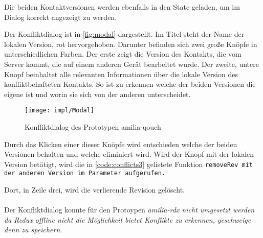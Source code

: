 Die beiden Kontaktversionen werden ebenfalls in den State geladen, um im Dialog korrekt angezeigt zu werden.
%
\begin{center}
  
\end{center}
%
Der Konfliktdialog ist in \autoref{fig:modal} dargestellt.
Im Titel steht der Name der lokalen Version, rot hervorgehoben.
Darunter befinden sich zwei große Knöpfe in unterschiedlichen Farben.
Der erste zeigt die Version des Kontakts, die vom Server kommt, die auf einem anderen Gerät bearbeitet wurde.
Der zweite, untere Knopf beinhaltet alle relevanten Informationen über die lokale Version des konfliktbehafteten Kontakts.
So ist zu erkennen welche der beiden Versionen die eigene ist und worin sie sich von der anderen unterscheidet.
%
\begin{figure}[H]
  \centering
  \texttt{[image: impl/Modal]}
  \grayRule
  \caption{Konfliktdialog des Prototypen amilia-qouch}
  \label{fig:modal}
\end{figure}
%
Durch das Klicken einer dieser Knöpfe wird entschieden welche der beiden Versionen behalten und welche eliminiert wird.
Wird der Knopf mit der lokalen Version betätigt, wird die in \autoref{code:conflicts3} gelistete Funktion \tt{removeRev} mit der anderen Version im Parameter aufgerufen.
%
\begin{center}
  
\end{center}
%
Dort, in Zeile drei, wird die verlierende Revision gelöscht.\\\\
%
%
Der Konfliktdialog konnte für den Protoypen \it{amilia-rdx} nicht umgesetzt werden da Redux offline nicht die Möglichkeit bietet Konflikte zu erkennen, geschweige denn zu speichern.